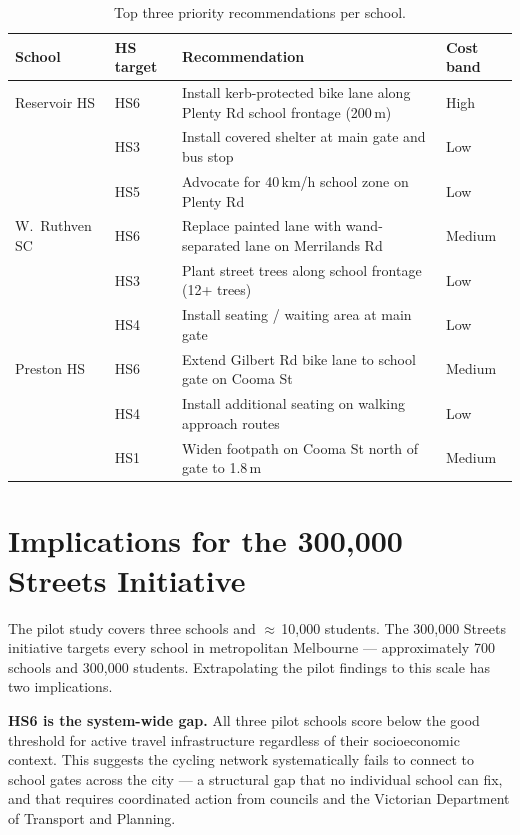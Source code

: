 \documentclass[11pt,a4paper,openany]{book}
\begin{document}
\begin{table}[ht]
\centering
\caption{Top three priority recommendations per school.}
\label{tab:top-recs}
\begin{tabular}{llL{6cm}l}
\toprule
School & HS target & Recommendation & Cost band \\
\midrule
Reservoir HS  & HS6 & Install kerb-protected bike lane along Plenty Rd school frontage (200\,m) & High \\
              & HS3 & Install covered shelter at main gate and bus stop & Low \\
              & HS5 & Advocate for 40\,km/h school zone on Plenty Rd & Low \\
\midrule
W.\ Ruthven SC & HS6 & Replace painted lane with wand-separated lane on Merrilands Rd & Medium \\
               & HS3 & Plant street trees along school frontage (12+ trees) & Low \\
               & HS4 & Install seating / waiting area at main gate & Low \\
\midrule
Preston HS    & HS6 & Extend Gilbert Rd bike lane to school gate on Cooma St & Medium \\
              & HS4 & Install additional seating on walking approach routes & Low \\
              & HS1 & Widen footpath on Cooma St north of gate to 1.8\,m & Medium \\
\bottomrule
\end{tabular}
\end{table}

\section{Implications for the 300,000 Streets Initiative}

The pilot study covers three schools and $\approx$\,10,000 students.  The 300,000
Streets initiative targets every school in metropolitan Melbourne --- approximately
700 schools and 300,000 students.  Extrapolating the pilot findings to this scale
has two implications.

\textbf{HS6 is the system-wide gap.}  All three pilot schools score below the good
threshold for active travel infrastructure regardless of their socioeconomic context.
This suggests the cycling network systematically fails to connect to school gates across
the city --- a structural gap that no individual school can fix, and that requires
coordinated action from councils and the Victorian Department of Transport and Planning.
\end{document}
